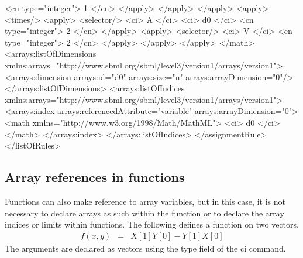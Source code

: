 \begin{example}
                            <cn type="integer"> 1 </cn>
                        </apply>
                    </apply>
                </apply>
                <apply>
                    <times/>
                    <apply>
                        <selector/>
                        <ci> A </ci>
                        <ci> d0 </ci>
                        <cn type="integer"> 2 </cn>
                    </apply>
                    <apply>
                        <selector/>
                        <ci> V </ci>
                        <cn type="integer"> 2 </cn>
                    </apply>
                </apply>
            </apply>
        </math>
        <arrays:listOfDimensions
            xmlns:arrays="http://www.sbml.org/sbml/level3/version1/arrays/version1">
            <arrays:dimension arrays:id="d0" arrays:size="n" arrays:arrayDimension="0"/>
        </arrays:listOfDimensions>
        <arrays:listOfIndices
            xmlns:arrays="http://www.sbml.org/sbml/level3/version1/arrays/version1">
            <arrays:index arrays:referencedAttribute="variable" arrays:arrayDimension="0">
                <math xmlns="http://www.w3.org/1998/Math/MathML">
                    <ci> d0 </ci>
                </math>
            </arrays:index>
        </arrays:listOfIndices>
    </assignmentRule>
</listOfRules>
\end{example}



\subsection{Array references in functions}

Functions can also make reference to array variables, but in this case, it is not necessary to declare arrays as such within the function or to declare the array indices or limits within functions.  The following defines a function on two vectors, 
\begin{eqnarray*}
f(x,y) & = & X[1]Y[0] - Y[1]X[0]
\end{eqnarray*}
The arguments are declared as vectors using the type field of the ci command.

